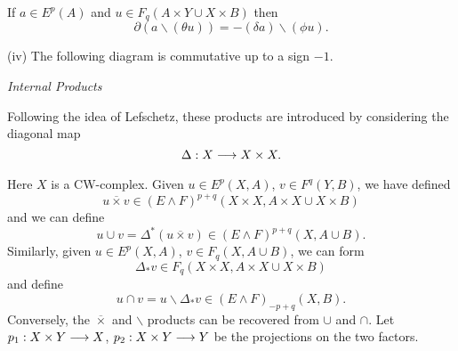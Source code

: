 \documentclass[../main]{subfiles}
\begin{document}
\begin{theorem}
\begin{enumerate}
If $a \in E^p(A)$ and $u \in F_q(A \times Y \cup X \times B)$ then \[\partial(a \backslash (\theta u)) = -(\delta a) \backslash (\phi u).\]

(iv) The following diagram is commutative up to a sign $-1$.\\
 {
}
\end{enumerate}
\end{theorem}

\emph{Internal Products} 

Following the idea of Lefschetz, these products are introduced by considering the diagonal map \[\Delta : X \lar{} X \times X.\] Here $X$ is a CW-complex. Given $u \in E^p(X, A)$, $v \in F^q(Y, B)$, we have defined \[u \overline \times v \in (E \wedge F)^{p + q}(X \times X, A \times X \cup X \times B)\] and we can define \[u \cup v = \Delta^\ast (u \overline \times v) \in (E \wedge F)^{p + q}(X, A \cup B).\] Similarly, given $u \in E^p(X, A)$, $v \in F_q(X, A \cup B)$, we can form \[\Delta_\ast v \in F_q(X \times X, A \times X \cup X \times B)\] and define \[u \cap v = u \backslash \Delta_\ast v \in (E \wedge F)_{-p + q} (X, B).\] Conversely, the $\overline \times$ and $\backslash$ products can be recovered from $\cup$ and $\cap$. Let $p_1 : X \times Y \lar{} X$, $p_2 : X \times Y \lar{} Y$ be the projections on the two factors.
\end{document}

